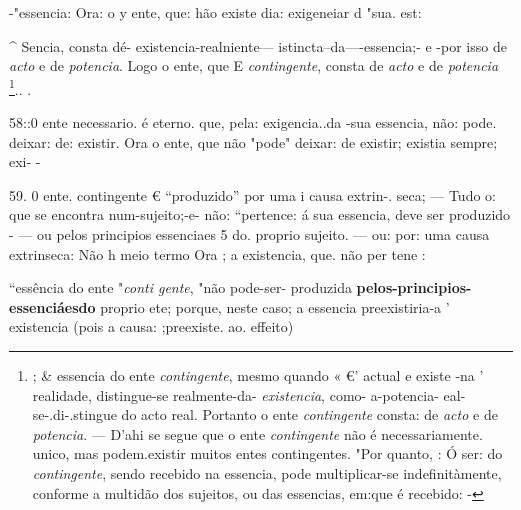   -"essencia: Ora: o y ente, que: hão existe dia: exigeneiar d "sua. est:

\textasciicircum{} Sencia, consta dé- existencia-realniente--- istincta--da----essencia;- e -por isso de \emph{acto} e de \emph{potencia}. Logo o ente, que E \emph{contingente}, \textbar{} consta de \emph{acto} e de \emph{potencia} \footnote{; \& essencia do ente \emph{contingente}, mesmo quando « €' actual e existe -na ' realidade, distingue-se realmente-da- \emph{existencia}, como- a-potencia- eal-se-.di-.stingue do acto real. Portanto o ente \emph{contingente} consta: de \emph{acto} e de \emph{potencia}. --- D'ahi se segue que o ente \emph{contingente} não é necessariamente. unico, mas podem.existir muitos entes contingentes. "Por quanto, : Ó ser: do \emph{contingente}, sendo recebido na essencia, pode multiplicar-se indefinitàmente, conforme a multidão dos sujeitos, ou das essencias, em:que é recebido: \textbar{} -}.. .

58::0 ente necessario. é eterno. \textbar{}que, pela: exigencia..da -sua essencia, não: pode. deixar: de: existir. Ora o ente, que não "pode" deixar: de existir; existia sempre; exi- -

59. 0 ente. contingente € “produzido” por uma i causa extrin-. seca; --- Tudo o: que se encontra num-sujeito;-e- não: “pertence: á sua essencia, deve ser produzido - --- ou pelos principios essenciaes 5 do. proprio sujeito. --- ou: por: uma causa extrinseca: Não h meio termo Ora ; a existencia, que. não per tene :

“essência do ente "\emph{conti gente}, "não pode-ser- produzida \textbf{pelos-principios-essenciáesdo} proprio ete; porque, neste caso; a essencia preexistiria-a ' existencia (pois a causa: ;preexiste. ao. effeito)


